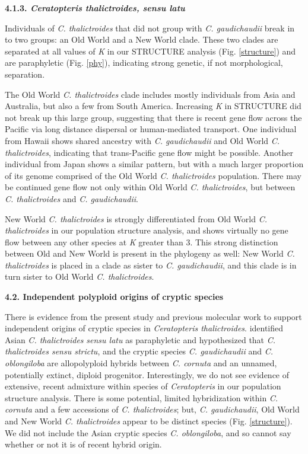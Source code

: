 \documentclass[12pt]{article}
\begin{document}
\begin{flushleft}
\textbf{4.1.3. \textit{Ceratopteris thalictroides, sensu latu}}

Individuals of \textit{C. thalictroides} that did not group with \textit{C. gaudichaudii} break in to two groups: an Old World and a New World clade. These two clades are separated at all values of \textit{K} in our {\small{STRUCTURE}} analysis (Fig. \ref{structure}) and are paraphyletic (Fig. \ref{phy}), indicating strong genetic, if not morphological, separation.

The Old World \textit{C. thalictroides} clade includes mostly individuals from Asia and Australia, but also a few from South America. Increasing \textit{K} in {\small{STRUCTURE}} did not break up this large group, suggesting that there is recent gene flow across the Pacific via long distance dispersal or human-mediated transport. One individual from Hawaii shows shared ancestry with \textit{C. gaudichaudii} and Old World \textit{C. thalictroides}, indicating that trans-Pacific gene flow might be possible. Another individual from Japan shows a similar pattern, but with a much larger proportion of its genome comprised of the Old World \textit{C. thalictroides} population. There may be continued gene flow not only within Old World \textit{C. thalictroides}, but between \textit{C. thalictroides} and \textit{C. gaudichaudii}.

New World \textit{C. thalictroides} is strongly differentiated from Old World \textit{C. thalictroides} in our population structure analysis, and shows virtually no gene flow between any other species at \textit{K} greater than 3. This strong distinction between Old and New World is present in the phylogeny as well: New World \textit{C. thalictroides} is placed in a clade as sister to \textit{C. gaudichaudii}, and this clade is in turn sister to Old World \textit{C. thalictroides}.

\textbf{4.2. Independent polyploid origins of cryptic species}

There is evidence from the present study and previous molecular work to support independent origins of cryptic species in \textit{Ceratopteris thalictroides}. \textcite{Adjie2007} identified Asian \textit{C. thalictroides} \textit{sensu latu} as paraphyletic and hypothesized that \textit{C. thalictroides sensu strictu}, and the cryptic species \textit{C. gaudichaudii} and \textit{C. oblongiloba} are allopolyploid hybrids between \textit{C. cornuta} and an unnamed, potentially extinct, diploid progenitor. Interestingly, we do not see evidence of extensive, recent admixture within species of \textit{Ceratopteris} in our population structure analysis. There is some potential, limited hybridization within \textit{C. cornuta} and a few accessions of \textit{C. thalictroides}; but, \textit{C. gaudichaudii}, Old World and New World \textit{C. thalictroides} appear to be distinct species (Fig. \ref{structure}). We did not include the Asian cryptic species \textit{C. oblongiloba}, and so cannot say whether or not it is of recent hybrid origin. 


\end{flushleft}
\end{document}
